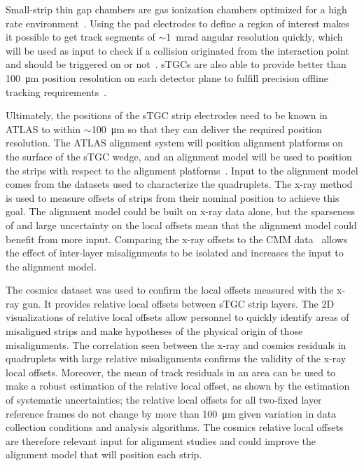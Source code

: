 Small-strip thin gap chambers are gas ionization chambers optimized for a high rate environment~\cite{nsw_tdr}. Using the pad electrodes to define a region of interest makes it possible to get track segments of $\sim$\SI{1}{mrad} angular resolution quickly, which will be used as input to check if a collision originated from the interaction point and should be triggered on or not~\cite{nsw_tdr, perez-codina_small-strip_2016}. sTGCs are also able to provide better than \SI{100}{\micro\meter} position resolution on each detector plane to fulfill precision offline tracking requirements~\cite{abusleme_performance_2016}. 

Ultimately, the positions of the sTGC strip electrodes need to be known in ATLAS to within $\sim$\SI{100}{\micro\meter} so that they can deliver the required position resolution. The ATLAS alignment system will position alignment platforms on the surface of the sTGC wedge, and an alignment model will be used to position the strips with respect to the alignment platforms~\cite{nsw_tdr}. Input to the alignment model comes from the datasets used to characterize the quadruplets. The x-ray method~\cite{lefebvre_precision_2020} is used to measure offsets of strips from their nominal position to achieve this goal. The alignment model could be built on x-ray data alone, but the sparseness of and large uncertainty on the local offsets mean that the alignment model could benefit from more input. Comparing the x-ray offsets to the CMM data~\cite{carlson_results_2019} allows the effect of inter-layer misalignments to be isolated and increases the input to the alignment model. 

The cosmics dataset was used to confirm the local offsets measured with the x-ray gun. It provides relative local offsets between sTGC strip layers. The 2D visualizations of relative local offsets allow personnel to quickly identify areas of misaligned strips and make hypotheses of the physical origin of those misalignments. The correlation seen between the x-ray and cosmics residuals in quadruplets with large relative misalignments confirms the validity of the x-ray local offsets. Moreover, the mean of track residuals in an area can be used to make a robust estimation of the relative local offset, as shown by the estimation of systematic uncertainties; the relative local offsets for all two-fixed layer reference frames do not change by more than \SI{100}{\micro\meter} given variation in data collection conditions and analysis algorithms. The cosmics relative local offsets are therefore relevant input for alignment studies and could improve the alignment model that will position each strip. 

